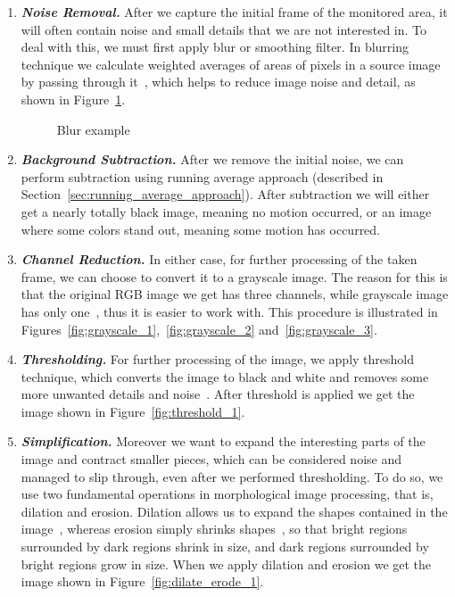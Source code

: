 	\begin{enumerate}
	\item \textit{\textbf{Noise Removal.}} After we capture the initial frame of the monitored area, it will often contain noise and small details that we are not interested in. To deal with this, we must first apply blur or smoothing filter. In blurring technique we calculate weighted averages of areas of pixels in a source image by passing through it~\cite{blur_1}, which helps to reduce image noise and detail, as shown in Figure~\ref{fig:blur_example}.
	\begin{figure}[ht]
		\centering
		\quad
		\caption{Blur example}
		\label{fig:blur_example}
	\end{figure}
	
	\item \textit{\textbf{Background Subtraction.}} After we remove the initial noise, we can perform subtraction using running average approach (described in Section~\ref{sec:running_average_approach}). After subtraction we will either get a nearly totally black image, meaning no motion occurred, or an image where some colors stand out, meaning some motion has occurred. 
	
	\item \textit{\textbf{Channel Reduction.}} In either case, for further processing of the taken frame, we can choose to convert it to a grayscale image. The reason for this is that the original RGB image we get has three channels, while grayscale image has only one~\cite{grayscale_1}, thus it is easier to work with. This procedure is illustrated in Figures~\ref{fig:grayscale_1},~\ref{fig:grayscale_2} and~\ref{fig:grayscale_3}. 
	
	\item \textit{\textbf{Thresholding.}} For further processing of the image, we apply threshold technique, which converts the image to black and white and removes some more unwanted details and noise~\cite{threshold_1}. After threshold is applied we get the image shown in Figure~\ref{fig:threshold_1}. 
	
	\item \textit{\textbf{Simplification.}} Moreover we want to expand the interesting parts of the image and contract smaller pieces, which can be considered noise and managed to slip through, even after we performed thresholding. To do so, we use two fundamental operations in morphological image processing, that is, dilation and erosion. Dilation allows us to expand the shapes contained in the image~\cite{dilation_1}, whereas erosion simply shrinks shapes~\cite{erosion_1}, so that bright regions surrounded by dark regions shrink in size, and dark regions surrounded by bright regions grow in size. When we apply dilation and erosion we get the image shown in Figure~\ref{fig:dilate_erode_1}. 
	

\end{enumerate}
